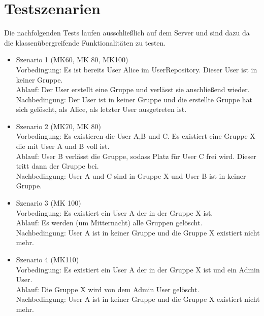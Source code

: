 \documentclass[a4paper]{scrreprt}
\begin{document}
\section{Testszenarien}

Die nachfolgenden Tests laufen ausschließlich auf dem Server und sind dazu da die klassenübergreifende Funktionalitäten zu testen.\\


\begin{itemize}

\item Szenario 1 (MK60, MK 80, MK100)\\
Vorbedingung: Es ist bereits User Alice im UserRepository. Dieser User ist in keiner Gruppe.\\
Ablauf: Der User erstellt eine Gruppe und verlässt sie anschließend wieder.\\
Nachbedingung: Der User ist in keiner Gruppe und die erstellte Gruppe hat sich gelöscht, als Alice, als letzter User ausgetreten ist.\\


\item Szenario 2 (MK70, MK 80)\\
Vorbedingung: Es existieren die User A,B und C. Es existiert eine Gruppe X die mit User A und B voll ist. \\
Ablauf: User B verlässt die Gruppe, sodass Platz für User C frei wird. Dieser tritt dann der Gruppe bei.\\
Nachbedingung: User A und C sind in Gruppe X und User B ist in keiner Gruppe.\\


\item Szenario 3 (MK 100)\\
Vorbedingung: Es existiert ein User A der in der Gruppe X ist.\\
Ablauf: Es werden (um Mitternacht) alle Gruppen gelöscht.\\
Nachbedingung: User A  ist in keiner Gruppe und die Gruppe X existiert nicht mehr.\\

\item Szenario 4 (MK110)\\
Vorbedingung: Es existiert ein User A der in der Gruppe X ist und ein Admin User.\\
Ablauf: Die Gruppe X wird von dem Admin User gelöscht.\\
Nachbedingung: User A  ist in keiner Gruppe und die Gruppe X existiert nicht mehr.\\


\end{itemize}
\end{document}
